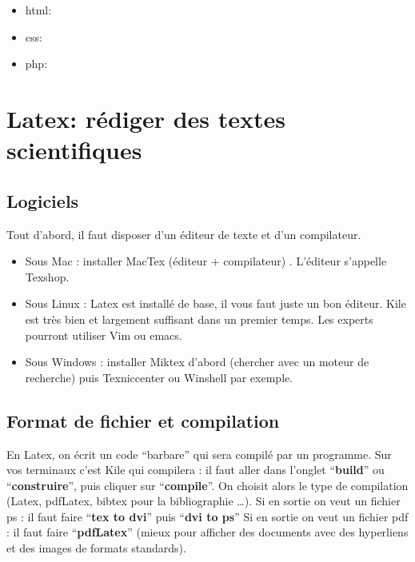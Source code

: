 \documentclass[a4paper,10pt]{article}
\begin{document}
\begin{itemize}
 \item  html:
 \item  css:
 \item  php:
\end{itemize}


\section{Latex: rédiger des textes scientifiques}

\subsection{Logiciels}
Tout d'abord, il faut disposer d'un éditeur de texte et d'un compilateur.

\begin{itemize}
\item Sous Mac : installer MacTex  (éditeur + compilateur) . L'éditeur s'appelle Texshop.  
\item Sous Linux : Latex est installé de base, il vous faut juste un bon éditeur. Kile est très bien et largement suffisant
dans un premier temps. Les experts pourront utiliser Vim ou emacs. 
\item Sous Windows : installer Miktex d'abord (chercher avec un moteur de recherche) puis Texniccenter ou  Winshell par exemple.
\end{itemize}


\subsection{Format de fichier et compilation}

En Latex, on écrit un code ``barbare'' qui sera compil\'e par un programme. Sur vos terminaux c'est Kile qui compilera : il faut aller dans l'onglet ``\textbf{build}'' ou ``\textbf{construire}'', puis cliquer sur ``\textbf{compile}''. On choisit alors le type de compilation (Latex, pdfLatex, bibtex pour la bibliographie \ldots). 
Si en sortie on veut un fichier ps : il faut faire ``\textbf{tex to dvi}'' puis  ``\textbf{dvi to ps}''
Si en sortie on veut un fichier pdf : il faut faire ``\textbf{pdfLatex}'' (mieux pour afficher des documents avec des hyperliens et des images de formats standards).
\end{document}
